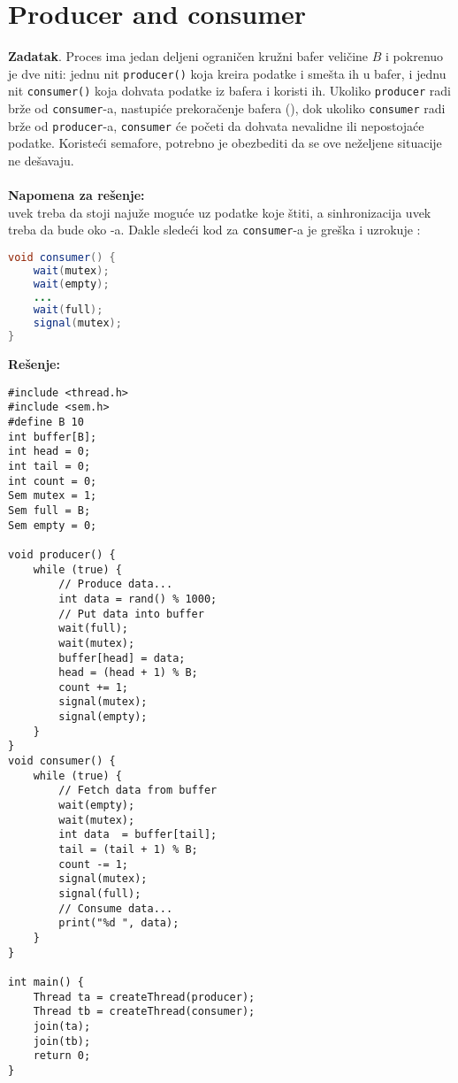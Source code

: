 \clearpage
\section{\latin Producer and consumer}
\textbf{\large Zadatak}. Proces ima jedan deljeni ograni\v{c}en kru\v{z}ni bafer veli\v{c}ine $B$ i pokrenuo je dve niti: jednu nit \texttt{producer()} koja kreira podatke i sme\v{s}ta ih u bafer, i jednu nit \texttt{consumer()} koja dohvata podatke iz bafera i koristi ih. Ukoliko \texttt{producer} radi br\v{z}e od \texttt{consumer}-a, nastupi\'{c}e prekora\v{c}enje bafera (), dok ukoliko \texttt{consumer} radi br\v{z}e od \texttt{producer}-a, \texttt{consumer} \'{c}e po\v{c}eti da dohvata nevalidne ili nepostoja\'{c}e podatke. Koriste\'{c}i semafore, potrebno je obezbediti da se ove ne\v{z}eljene situacije ne de\v{s}avaju.
\\\\
\textbf{Napomena za re\v{s}enje:}\\
 uvek treba da stoji naju\v{z}e mogu\'{c}e uz podatke koje \v{s}titi, a sinhronizacija uvek treba da bude oko -a. Dakle slede\'{c}i kod za \texttt{consumer}-a je gre\v{s}ka i uzrokuje :
\begin{lstlisting}[language=java]
void consumer() {
    wait(mutex); 
    wait(empty);
    ...
    wait(full);
    signal(mutex);
}
\end{lstlisting}
\textbf{\large Re\v{s}enje:}
\begin{lstlisting}
#include <thread.h>
#include <sem.h>
#define B 10
int buffer[B];
int head = 0;
int tail = 0;
int count = 0;
Sem mutex = 1;
Sem full = B;
Sem empty = 0;

void producer() {
    while (true) {
        // Produce data...
        int data = rand() % 1000;
        // Put data into buffer
        wait(full);
        wait(mutex);
        buffer[head] = data;
        head = (head + 1) % B;
        count += 1;
        signal(mutex);
        signal(empty);
    }
}
void consumer() {
    while (true) {
        // Fetch data from buffer
        wait(empty);
        wait(mutex);
        int data  = buffer[tail];
        tail = (tail + 1) % B;
        count -= 1;
        signal(mutex);
        signal(full);
        // Consume data... 
        print("%d ", data);
    }
}

int main() {
    Thread ta = createThread(producer);
    Thread tb = createThread(consumer);
    join(ta);
    join(tb);
    return 0;
}

\end{lstlisting}